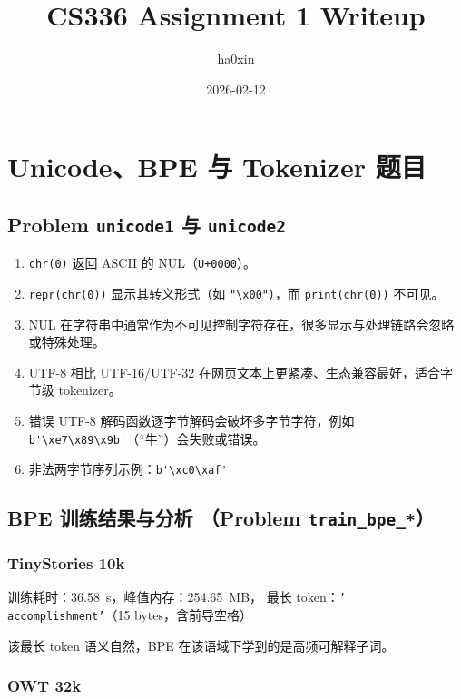 \documentclass[UTF8,11pt,a4paper]{ctexart}
\title{CS336 Assignment 1 Writeup}
\author{ha0xin}
\date{2026-02-12}
\begin{document}
\maketitle
\tableofcontents
\newpage

\section{Unicode、BPE 与 Tokenizer 题目}

\subsection{Problem \texttt{unicode1} 与 \texttt{unicode2}}

\begin{enumerate}
  \item \texttt{chr(0)} 返回 ASCII 的 NUL（\texttt{U+0000}）。
  \item \texttt{repr(chr(0))} 显示其转义形式（如 \texttt{"\textbackslash x00"}），而 \texttt{print(chr(0))} 不可见。
  \item NUL 在字符串中通常作为不可见控制字符存在，很多显示与处理链路会忽略或特殊处理。
  \item UTF-8 相比 UTF-16/UTF-32 在网页文本上更紧凑、生态兼容最好，适合字节级 tokenizer。
  \item 错误 UTF-8 解码函数逐字节解码会破坏多字节字符，例如 \verb|b'\xe7\x89\x9b'|（“牛”）会失败或错误。
  \item 非法两字节序列示例：\verb|b'\xc0\xaf'|
\end{enumerate}

\subsection{BPE 训练结果与分析 （Problem \texttt{train\_bpe\_*}）}

\subsubsection{TinyStories 10k}

训练耗时：\SI{36.58}{s}，峰值内存：\SI{254.65}{MB}， 最长 token：\texttt{' accomplishment'}（15 bytes，含前导空格）

该最长 token 语义自然，BPE 在该语域下学到的是高频可解释子词。

\subsubsection{OWT 32k}
\end{document}
